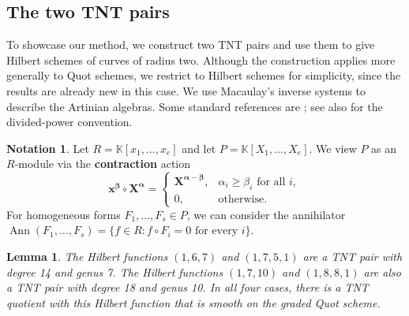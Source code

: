 \documentclass[leqno,11pt,a4paper]{amsart}
\newtheorem{lemma}[lemma]{Lemma}
\theoremstyle{definition}
\newtheorem{notation}[notation]{Notation}
\numberwithin{equation}{section}
\newcommand{\kk}{\mathbb{K}}
\newcommand{\bfx}{\boldsymbol{x}}
\DeclareMathOperator{\Ann}{Ann}
\begin{document}
\subsection{The two TNT pairs}
To showcase our method, we construct two TNT pairs and use them to give Hilbert schemes
of curves of radius two. 
Although the construction applies more generally to Quot schemes, we restrict to Hilbert schemes for simplicity, since the results are already new in this case.
We use Macaulay's inverse systems to describe
the Artinian algebras. Some standard references are
\cite{Macaulay_inverse_systems,iaCompressed,EliasRossiShortGorenstein,Jel_classifying};
see also \cite[Appendix A]{iakanev} for the divided-power
convention.
\begin{notation}
Let $R=\kk[x_1,\ldots,x_e]$ and let $P=\kk[X_1,\dots,X_e]$. 
We view $P$ as an $R$-module via the \textbf{contraction} action
$$
\bfx^{\boldsymbol{\beta}} \circ \boldsymbol{X}^{\boldsymbol{\alpha}}=
\begin{cases}
\boldsymbol{X}^{\boldsymbol{\alpha}-\boldsymbol{\beta}},&\alpha_i\geq\beta_i\text{ for all }i,\\
0,&\text{otherwise}.
\end{cases}
$$
For homogeneous forms $F_1,\ldots,F_s\in P$, we can consider the annihilator
$\Ann(F_1,\ldots,F_s) = \{f \in R: f \circ F_i=0 \text{ for every }i \}$.
\end{notation}



\begin{lemma} \label{TNT_1} \label{TNT_2} \label{two_TNT_pairs}
The Hilbert functions $(1,6,7)$ and $(1,7,5,1)$ are a TNT pair with degree 14 and genus 7. 
The Hilbert functions $(1,7,10)$ and $(1,8,8,1)$ are also a TNT pair with degree 18 and genus 10.
In all four cases, there is a TNT quotient with this Hilbert function that is smooth on the graded Quot scheme.
\end{lemma}
\end{document}
